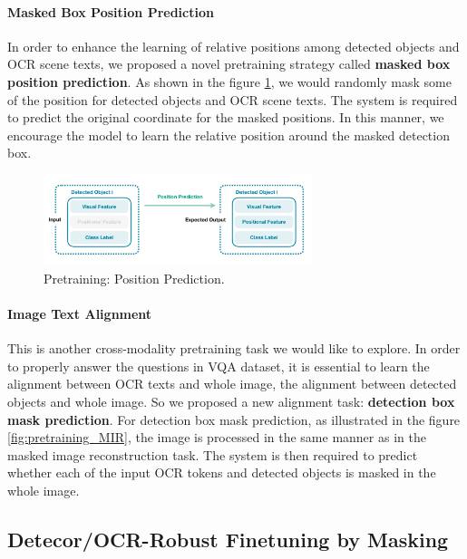 \documentclass[11pt,a4paper]{article}
\begin{document}
\paragraph{Masked Box Position Prediction} In order to enhance the learning of relative positions among detected objects and OCR scene texts, we proposed a novel pretraining strategy called \textbf{masked box position prediction}. As shown in the figure \ref{fig:pretraining_PP}, we would randomly mask some of the position for detected objects and OCR scene texts. The system is required to predict the original coordinate for the masked positions. In this manner, we encourage the model to learn the relative position around the masked detection box.
\begin{figure}[h]
\centering
  \includegraphics[width=0.7\textwidth]{figures/Pretraining_PositionPrediction.pdf}
  \caption{Pretraining: Position Prediction.}
  \label{fig:pretraining_PP}
\end{figure}

\paragraph{Image Text Alignment} This is another cross-modality pretraining task we would like to explore. In order to properly answer the questions in VQA dataset, it is essential to learn the alignment between OCR texts and whole image, the alignment between detected objects and whole image. So we proposed a new alignment task: \textbf{detection box mask prediction}. For detection box mask prediction, as illustrated in the figure \ref{fig:pretraining_MIR}, the image is processed in the same manner as in the masked image reconstruction task. The system is then required to predict whether each of the input OCR tokens and detected objects is masked in the whole image.


\subsection{Detecor/OCR-Robust Finetuning by Masking} \label{subsec:finetune}
\end{document}
